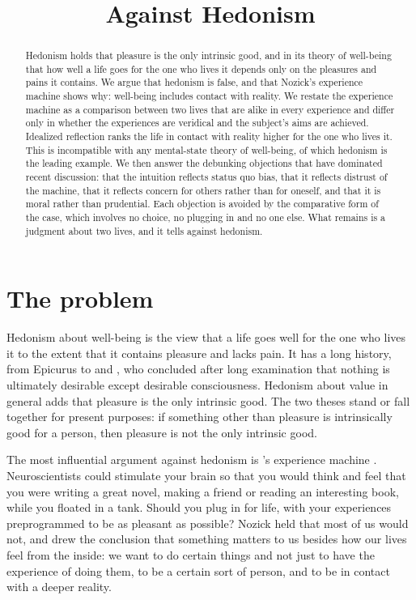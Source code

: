 \documentclass{situationist-preprint}
\title{Against Hedonism}
\begin{document}
\maketitle

\begin{abstract}
Hedonism holds that pleasure is the only intrinsic good, and in its theory of well-being that how well a life goes for the one who lives it depends only on the pleasures and pains it contains. We argue that hedonism is false, and that Nozick's experience machine shows why: well-being includes contact with reality. We restate the experience machine as a comparison between two lives that are alike in every experience and differ only in whether the experiences are veridical and the subject's aims are achieved. Idealized reflection ranks the life in contact with reality higher for the one who lives it. This is incompatible with any mental-state theory of well-being, of which hedonism is the leading example. We then answer the debunking objections that have dominated recent discussion: that the intuition reflects status quo bias, that it reflects distrust of the machine, that it reflects concern for others rather than for oneself, and that it is moral rather than prudential. Each objection is avoided by the comparative form of the case, which involves no choice, no plugging in and no one else. What remains is a judgment about two lives, and it tells against hedonism.
\end{abstract}

\section{The problem}

Hedonism about well-being is the view that a life goes well for the one who lives it to the extent that it contains pleasure and lacks pain. It has a long history, from Epicurus to \citet{Bentham1789} and \citet{Sidgwick1907}, who concluded after long examination that nothing is ultimately desirable except desirable consciousness. Hedonism about value in general adds that pleasure is the only intrinsic good. The two theses stand or fall together for present purposes: if something other than pleasure is intrinsically good for a person, then pleasure is not the only intrinsic good.

The most influential argument against hedonism is \citeauthor{Nozick1974}'s experience machine \citep[42--45]{Nozick1974}. Neuroscientists could stimulate your brain so that you would think and feel that you were writing a great novel, making a friend or reading an interesting book, while you floated in a tank. Should you plug in for life, with your experiences preprogrammed to be as pleasant as possible? Nozick held that most of us would not, and drew the conclusion that something matters to us besides how our lives feel from the inside: we want to do certain things and not just to have the experience of doing them, to be a certain sort of person, and to be in contact with a deeper reality.
\end{document}
